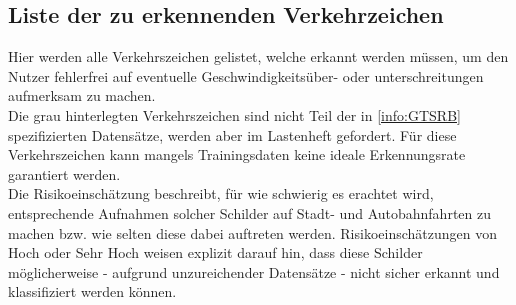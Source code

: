 \begin{appendix}
\pagebreak

\section{Liste der zu erkennenden Verkehrzeichen}
\label{sec:liste_zu_erkennende_verkehrszeichen}
Hier werden alle Verkehrszeichen gelistet, welche erkannt werden müssen, um den Nutzer fehlerfrei auf eventuelle Geschwindigkeitsüber- oder unterschreitungen aufmerksam zu machen.\\
Die grau hinterlegten Verkehrszeichen sind nicht Teil der in \cref{info:GTSRB} spezifizierten Datensätze, werden aber im Lastenheft gefordert. Für diese Verkehrszeichen kann mangels Trainingsdaten keine ideale Erkennungsrate garantiert werden.\\
Die Risikoeinschätzung beschreibt, für wie schwierig es erachtet wird, entsprechende Aufnahmen solcher Schilder auf Stadt- und Autobahnfahrten zu machen bzw. wie selten diese dabei auftreten werden. Risikoeinschätzungen von \glqq{}Hoch\grqq{} oder \glqq{}Sehr Hoch\grqq{} weisen explizit darauf hin, dass diese Schilder möglicherweise - aufgrund unzureichender Datensätze - nicht sicher erkannt und klassifiziert werden können.\\


\end{appendix}
